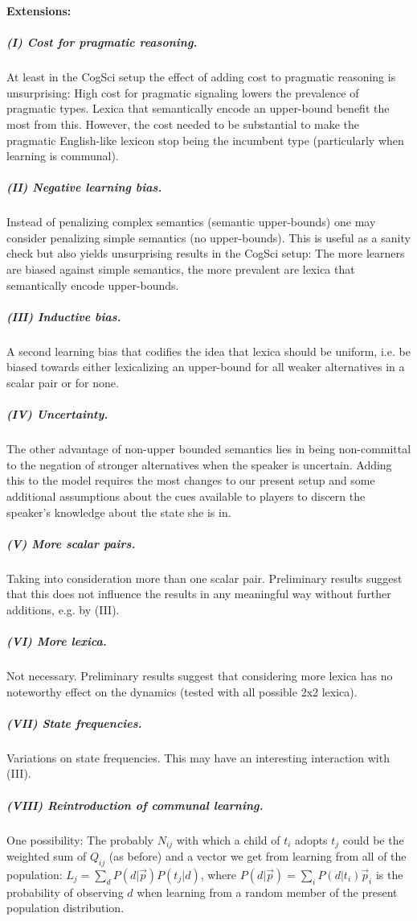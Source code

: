 \documentclass[a4paper]{article}
\begin{document}
{\bf Extensions:}

\subparagraph{(I) Cost for pragmatic reasoning.} At least in the CogSci setup the effect of adding cost to pragmatic reasoning is unsurprising: High cost for pragmatic signaling lowers the prevalence of pragmatic types. Lexica that semantically encode an upper-bound benefit the most from this. However, the cost needed to be substantial to make the pragmatic English-like lexicon stop being the incumbent type (particularly when learning is communal). 

\subparagraph{(II) Negative learning bias.} Instead of penalizing complex semantics (semantic upper-bounds) one may consider penalizing simple semantics (no upper-bounds). This is useful as a sanity check but also yields unsurprising results in the CogSci setup: The more learners are biased against simple semantics, the more prevalent are lexica that semantically encode upper-bounds. 

\subparagraph{(III) Inductive bias.} A second learning bias that codifies the idea that lexica should be uniform, i.e. be biased towards either lexicalizing an upper-bound for all weaker alternatives in a scalar pair or for none.

\subparagraph{(IV)  Uncertainty.} The other advantage of non-upper bounded semantics lies in being non-committal to the negation of stronger alternatives when the speaker is uncertain. Adding this to the model requires the most changes to our present setup and some additional assumptions about the cues available to players to discern the speaker's knowledge about the state she is in. 

\subparagraph{(V) More scalar pairs.} Taking into consideration more than one scalar pair. Preliminary results suggest that this does not influence the results in any meaningful way without further additions, e.g. by (III).

\subparagraph{(VI) More lexica.} Not necessary. Preliminary results suggest that considering more lexica has no noteworthy effect on the dynamics (tested with all possible 2x2 lexica).

\subparagraph{(VII) State frequencies.} Variations on state frequencies. This may have an interesting interaction with (III).

\subparagraph{(VIII) Reintroduction of communal learning.} One possibility: The probably $N_{ij}$ with which a child of $t_i$ adopts $t_j$ could be the weighted sum of $Q_{ij}$ (as before) and a vector we get from learning from all of the population: $L_j = \sum_d P(d | \vec{p})  P(t_j | d)$, where $P(d | \vec{p}) = \sum_{i} P(d | t_i)  \vec{p}_i$ is the probability of observing $d$ when learning from a random member of the present population distribution.
\end{document}
